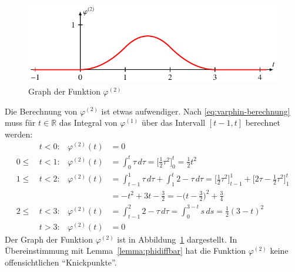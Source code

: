 \begin{beispiel}
\begin{figure}
\centering
\includegraphics{chapters/9-spline/images/phi2.pdf}
\caption{Graph der Funktion $\varphi^{(2)}$
\label{spline:phi2}}
\end{figure}
Die Berechnung von $\varphi^{(2)}$ ist etwas aufwendiger.
Nach \eqref{eq:varphin-berechnung} muss
für $t\in\mathbb R$ das Integral von $\varphi^{(1)}$ über
das Intervall $[t-1,t]$ berechnet werden:
\begin{align*}
&t<0:
&
\varphi^{(2)}(t)
&=0
\\
0\le\,&t<1:
&
\varphi^{(2)}(t)
&=
\int_0^t\tau\,d\tau
=
\biggl[\frac12\tau^2\biggr]_0^t = \frac12t^2
\\
1\le\,&t<2:
&
\varphi^{(2)}(t)
&=
\int_{t-1}^1 \tau\,d\tau
+
\int_1^t 2-\tau\,d\tau
=
\biggl[\frac12\tau^2\biggr]_{t-1}^1
+
\biggl[2\tau-\frac12\tau^2\biggr]_1^t
\\
&&
&=
-t^2+3t-\frac32
=
-\biggl(t-\frac32\biggr)^2+\frac34
\\
2\le\,&t<3:
&
\varphi^{(2)}(t)
&=
\int_{t-1}^2 2-\tau\,d\tau
=
\int_0^{3-t} s\,ds
=
\frac12(3-t)^2
\\
&t>3:
&
\varphi^{(2)}(t)
&=
0
\end{align*}
Der Graph der Funktion $\varphi^{(2)}$ ist in Abbildung~\ref{spline:phi2}
dargestellt.
In Übereinstimmung mit Lemma~\ref{lemma:phidiffbar} hat die Funktion
$\varphi^{(2)}$ keine offensichtlichen ``Knickpunkte''.
\end{beispiel}

